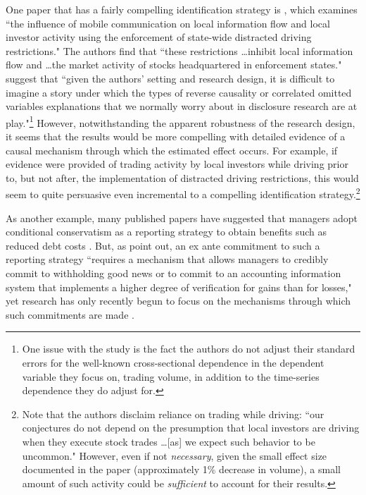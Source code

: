 \documentclass[11pt,reqno,titlepage]{amsart}
\begin{document}
\begin{doublespace}
One paper that has a fairly compelling identification strategy is \citet{Brown:2015ik}, which examines ``the influence of mobile communication on local information flow and local investor activity using the enforcement of state-wide distracted driving restrictions."
The authors find that ``these restrictions \dots inhibit local information flow and \dots the market activity of stocks headquartered in enforcement states."
\citet[p.\,9]{Miller:2015ec} suggest that ``given the authors' setting and research design, it is difficult to imagine a story under which the types of reverse causality or correlated omitted variables explanations that we normally worry about in disclosure research are at play."\footnote{
One issue with the study is the fact the authors do not adjust their standard errors for the well-known cross-sectional dependence in the dependent variable they focus on, trading volume, in addition to the time-series dependence they do adjust for.}
However, notwithstanding the apparent robustness of the research design, it seems that the results would be more compelling with detailed evidence of a causal mechanism through which the estimated  effect occurs.
For example, if evidence were provided of trading activity by local investors while driving prior to, but not after, the implementation of distracted driving restrictions, this would seem to quite persuasive even incremental to a compelling identification strategy.\footnote{
Note that the authors disclaim reliance on trading while driving: ``our conjectures do not depend on the presumption that local investors are driving when they execute stock trades \dots [as] we expect such behavior to be uncommon."
However, even if not \emph{necessary}, given the small effect size documented in the paper (approximately 1\% decrease in volume), a small amount of such activity could be \emph{sufficient} to account for their results.}

As another example, many published papers have suggested that managers adopt conditional conservatism as a reporting strategy to obtain benefits such as reduced debt costs \citep{Ahmed:2002aa,Zhang:2008bc}.
But, as \citet[p\,317]{Beyer:2010cj} point out, an ex ante commitment to such a reporting strategy ``requires a mechanism that allows managers to credibly commit to withholding good news or to commit to an accounting information system that implements a higher degree of verification for gains than for losses," yet research has only recently begun to focus on the mechanisms through which such commitments are made \citep[e.g.,][]{Erkens:2014hj}.


\end{doublespace}
\end{document}
